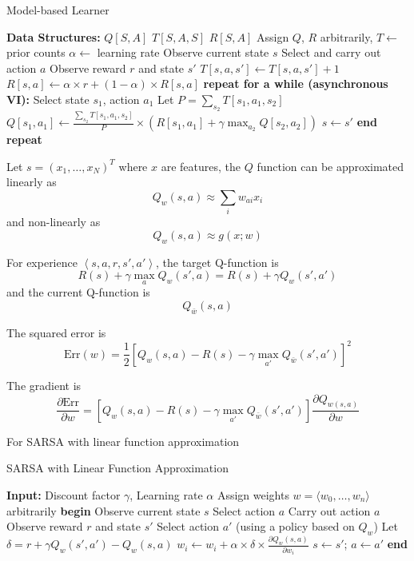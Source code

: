 \documentclass[11pt]{article}
\begin{document}
\begin{algorithm}
\caption{Model-based Learner}
\begin{algorithmic}[1]
\State \textbf{Data Structures:}
\State \quad $Q[S,A]$  
\State \quad $T[S,A,S]$  
\State \quad $R[S,A]$  
\State Assign $Q$, $R$ arbitrarily, $T \gets$ prior counts
\State $\alpha \gets$ learning rate
\State Observe current state $s$
\Repeat
    \State Select and carry out action $a$
    \State Observe reward $r$ and state $s'$
    \State $T[s, a, s'] \gets T[s, a, s'] + 1$
    \State $R[s, a] \gets \alpha \times r + (1 - \alpha) \times R[s, a]$
\State \textbf{repeat for a while (asynchronous VI):}
\State Select state $s_1$, action $a_1$
\State Let $P = \sum_{s_2} T[s_1, a_1, s_2]$
\State $Q[s_1, a_1] \gets \frac{\sum_{s_2} T[s_1, a_1, s_2]}{P} \times (R[s_1, a_1] + \gamma \max_{a_2} Q[s_2, a_2])$
\State $s \gets s'$
\State \textbf{end repeat}
\end{algorithmic}
\end{algorithm}

Let \(s = (x_{1}, \dots, x_{N})^{T}\) where \(x\) are features,
the \(Q\) function can be approximated linearly as
$$ Q_{w}(s,a) \approx \sum_{i} w_{ai}x_{i} $$
and non-linearly as
$$ Q_{w} (s,a) \approx g(x ; w) $$

For experience \(\left< s, a, r, s', a' \right>\),
the target Q-function is
$$ R(s) + \gamma \max_{a} Q_{w}(s', a) = R(s) + \gamma Q_{w}(s', a') $$
and the current Q-function is
$$ Q_{\bar{w}}(s, a) $$

The squared error is
$$ \text{Err}(w) = \frac{1}{2} \left[ Q_{w}(s, a) - R(s) - \gamma \max_{a'} Q_{\bar{w}} (s', a') \right]^{2} $$

The gradient is
$$ \frac{\partial \text{Err}}{\partial w} = \left[ Q_{w}(s, a) - R(s) - \gamma \max_{a'} Q_{\bar{w}} (s', a') \right] \frac{\partial Q_{w(s, a)}}{\partial w} $$

For SARSA with linear function approximation
\begin{algorithm}
\caption{SARSA with Linear Function Approximation}
\begin{algorithmic}[1]
\State \textbf{Input:} Discount factor $\gamma$, Learning rate $\alpha$
\State Assign weights $w = \langle w_0, \dots, w_n \rangle$ arbitrarily
\State \textbf{begin}
\State \quad Observe current state $s$
\State \quad Select action $a$
\Repeat
    \State \quad Carry out action $a$
    \State \quad Observe reward $r$ and state $s'$
    \State \quad Select action $a'$ (using a policy based on $Q_w$)
    \State \quad Let $\delta = r + \gamma Q_w(s', a') - Q_w(s, a)$
        \State \quad $w_i \gets w_i + \alpha \times \delta \times \frac{\partial Q_w(s, a)}{\partial w_i}$
    \EndFor
    \State \quad $s \gets s'$; $a \gets a'$
\State \textbf{end}
\end{algorithmic}
\end{algorithm}
\end{document}
